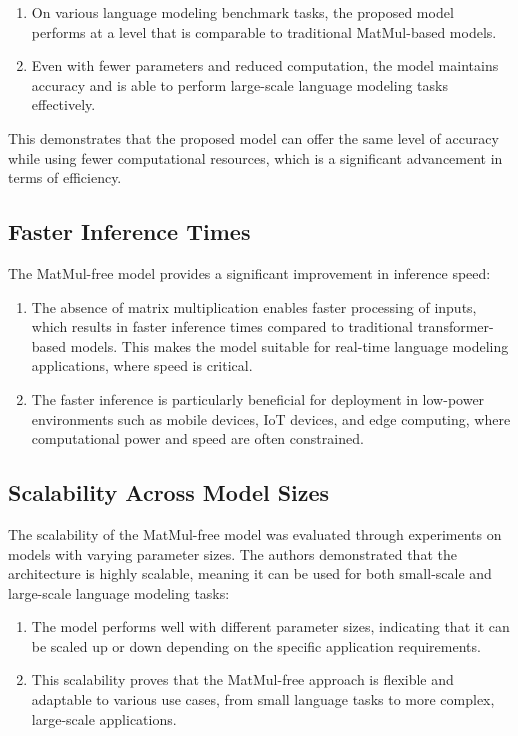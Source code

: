 \documentclass{report}
\begin{document}
	\begin{enumerate}
		\item 
		On various language modeling benchmark tasks, the proposed model performs at a level that is comparable to traditional MatMul-based models.
		
		\item 
		Even with fewer parameters and reduced computation, the model maintains accuracy and is able to perform large-scale language modeling tasks effectively.
	\end{enumerate}
	This demonstrates that the proposed model can offer the same level of accuracy while using fewer computational resources, which is a significant advancement in terms of efficiency.
	
	
	\subsection{Faster Inference Times}
	The MatMul-free model provides a significant improvement in inference speed:
	
	\begin{enumerate}
		\item 
		The absence of matrix multiplication enables faster processing of inputs, which results in faster inference times compared to traditional transformer-based models. This makes the model suitable for real-time language modeling applications, where speed is critical.
		
		\item 
		The faster inference is particularly beneficial for deployment in low-power environments such as mobile devices, IoT devices, and edge computing, where computational power and speed are often constrained.
	\end{enumerate}
	
	
	\subsection{Scalability Across Model Sizes}
	The scalability of the MatMul-free model was evaluated through experiments on models with varying parameter sizes. The authors demonstrated that the architecture is highly scalable, meaning it can be used for both small-scale and large-scale language modeling tasks:
	
	\begin{enumerate}
		\item 
		The model performs well with different parameter sizes, indicating that it can be scaled up or down depending on the specific application requirements.
		
		\item 
		This scalability proves that the MatMul-free approach is flexible and adaptable to various use cases, from small language tasks to more complex, large-scale applications.
	\end{enumerate}
	
\end{document}
